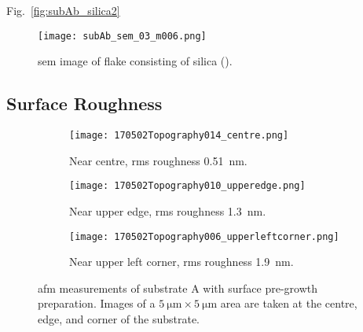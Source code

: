Fig.~\ref{fig:subAb_silica2}

\begin{figure}
    \centering
    \texttt{[image: subAb\_sem\_03\_m006.png]}
    \caption[\Ac{sem} image of silica flake.]{\Acf{sem} image of flake consisting of silica ().}
\end{figure}

\subsection{Surface Roughness}

\begin{figure}[htbp]
    \centering
    \begin{subfigure}[t]{\linewidth}
        \centering
        \texttt{[image: 170502Topography014\_centre.png]}
        \caption{Near centre, \ac{rms} roughness \SI{0.51}{\nano\metre}.} %
    \end{subfigure}%
    \par\bigskip
    \begin{subfigure}[t]{\linewidth}
        \centering
        \texttt{[image: 170502Topography010\_upperedge.png]}
        \caption{Near upper edge, \ac{rms} roughness \SI{1.3}{\nano\metre}.} %
    \end{subfigure}%
    \par\bigskip
    \begin{subfigure}[t]{\linewidth}
        \centering
        \texttt{[image: 170502Topography006\_upperleftcorner.png]}
        \caption{Near upper left corner, \ac{rms} roughness \SI{1.9}{\nano\metre}.}%
    \end{subfigure}%
    \caption[\Ac{afm} of substrate A with surface pre-growth preparation.]{\Acf{afm} measurements of substrate A with surface pre-growth preparation. Images of a $\SI{5}{\micro\metre}\times\SI{5}{\micro\metre}$ area are taken at the centre, edge, and corner of the substrate.}\label{fig:afm_subAb}
\end{figure} %

